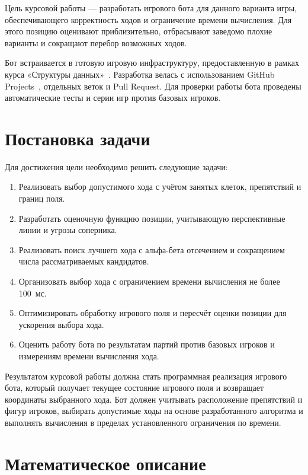 \documentclass[14pt,a4paper]{extarticle}
\begin{document}
	Цель курсовой работы --- разработать игрового бота для данного варианта игры, обеспечивающего корректность ходов и ограничение времени вычисления. Для этого позицию оценивают приблизительно, отбрасывают заведомо плохие варианты и сокращают перебор возможных ходов.
	
	Бот встраивается в готовую игровую инфраструктуру, предоставленную в рамках курса «Структуры данных»~\cite{repo}. Разработка велась с использованием GitHub Projects~\cite{ghprojects}, отдельных веток и Pull Request. Для проверки работы бота проведены автоматические тесты и серии игр против базовых игроков.
	
	
	\section{Постановка задачи}
	
	
	
	Для достижения цели необходимо решить следующие задачи:
	\begin{enumerate}
		\item Реализовать выбор допустимого хода с учётом занятых клеток, препятствий и границ поля.
		\item Разработать оценочную функцию позиции, учитывающую перспективные линии и угрозы соперника.
		\item Реализовать поиск лучшего хода с альфа-бета отсечением и сокращением числа рассматриваемых кандидатов.
		\item Организовать выбор хода с ограничением времени вычисления не более 100~мс.
		\item Оптимизировать обработку игрового поля и пересчёт оценки позиции для ускорения выбора хода.
		\item Оценить работу бота по результатам партий против базовых игроков и измерениям времени вычисления хода.
	\end{enumerate}
	
	Результатом курсовой работы должна стать программная реализация игрового бота, который получает текущее состояние игрового поля и возвращает координаты выбранного хода. Бот должен учитывать расположение препятствий и фигур игроков, выбирать допустимые ходы на основе разработанного алгоритма и выполнять вычисления в пределах установленного ограничения по времени.
	
	
	\section{Математическое описание}\label{sec:math}
	
\end{document}
